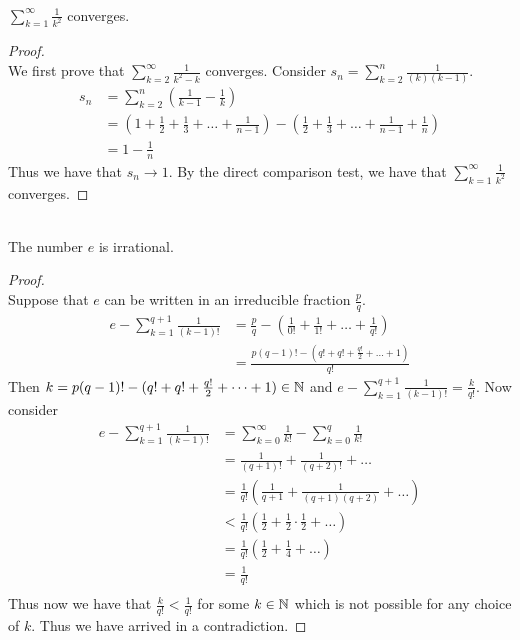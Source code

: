 \documentclass[a4paper]{article}
\begin{document}
\begin{lmm}{}{}\\ $\sum_{k=1}^\infty\frac{1}{k^2}$ converges. 
\begin{proof}\\ We first prove that $\sum_{k=2}^{\infty}\frac{1}{k^2-k}$ converges. Consider $s_n=\sum_{k=2}^{n}\frac{1}{(k)(k-1)}$. 
\begin{align*}
s_n&=\sum_{k=2}^{n}\left(\frac{1}{k-1}-\frac{1}{k}\right)\\
&=\left(1+\frac{1}{2}+\frac{1}{3}+\dots+\frac{1}{n-1}\right)-\left(\frac{1}{2}+\frac{1}{3}+\dots+\frac{1}{n-1}+\frac{1}{n}\right)\\
&=1-\frac{1}{n}
\end{align*}
Thus we have that $s_n\to1$. By the direct comparison test, we have that $\sum_{k=1}^\infty\frac{1}{k^2}$ converges. 
\end{proof}
\end{lmm}

\begin{lmm}{}{}\\ The number $e$ is irrational. 
\begin{proof}\\ Suppose that $e$ can be written in an irreducible fraction $\frac{p}{q}$. 
\begin{align*}
e-\sum_{k=1}^{q+1}\frac{1}{(k-1)!}&=\frac{p}{q}-\left(\frac{1}{0!}+\frac{1}{1!}+\dots+\frac{1}{q!}\right)\\
&=\frac{p(q-1)!-(q!+q!+\frac{q!}{2}+\dots+1)}{q!}
\end{align*}
Then $k=p(q-1)!-(q!+q!+\frac{q!}{2}+\dots+1)\in\mathbb{N}$ and $e-\sum_{k=1}^{q+1}\frac{1}{(k-1)!}=\frac{k}{q!}$. 
Now consider 
\begin{align*}
e-\sum_{k=1}^{q+1}\frac{1}{(k-1)!}&=\sum_{k=0}^{\infty}\frac{1}{k!}-\sum_{k=0}^{q}\frac{1}{k!}\\
&=\frac{1}{(q+1)!}+\frac{1}{(q+2)!}+\dots\\
&=\frac{1}{q!}\left(\frac{1}{q+1}+\frac{1}{(q+1)(q+2)}+\dots\right)\\
&<\frac{1}{q!}\left(\frac{1}{2}+\frac{1}{2}\cdot\frac{1}{2}+\dots\right)\tag{since $q>1$}\\
&=\frac{1}{q!}\left(\frac{1}{2}+\frac{1}{4}+\dots\right)\\
&=\frac{1}{q!}\tag{by geometric series}\\
\end{align*}
Thus now we have that $\frac{k}{q!}<\frac{1}{q!}$ for some $k\in\mathbb{N}$ which is not possible for any choice of $k$. Thus we have arrived in a contradiction. 
\end{proof}
\end{lmm}
\end{document}
